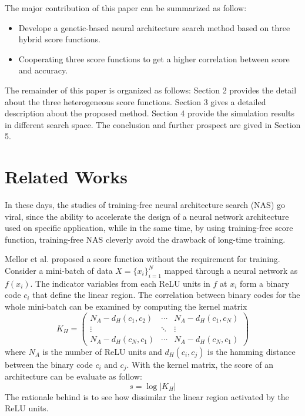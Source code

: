 \documentclass[sigconf]{acmart}
\begin{document}
    The major contribution of this paper can be summarized as follow:
    \begin{itemize}
        \item Develope a genetic-based neural architecture search method based on three hybrid score functions.
        \item Cooperating three score functions to get a higher correlation between score and accuracy.
    \end{itemize}

    The remainder of this paper is organized as follows: Section 2 provides the 
    detail about the three heterogeneous score functions. Section 3 gives a detailed 
    description about the proposed method. Section 4 provide the simulation results 
    in different search space. The conclusion and further prospect are gived in 
    Section 5.

    \section{Related Works}
    In these days, the studies of training-free neural architecture search (NAS) 
    go viral, since the ability to accelerate the design of a neural network 
    architecture used on specific application, while in the same time, by using 
    training-free score function, training-free NAS cleverly avoid the drawback 
    of long-time training. 

    Mellor et al. \cite{https://doi.org/10.48550/arxiv.2006.04647} proposed a 
    score function without the requirement for training. 
    Consider a mini-batch of data $X=\{x_i\}^N_{i=1}$ mapped through a neural 
    network as $f(x_i)$. The indicator variables from each ReLU units in $f$ 
    at $x_i$ form a binary code $c_i$ that define the linear region.
    The correlation between binary codes for the whole mini-batch can be examined 
    by computing the kernel matrix
    \begin{equation}
        K_H=\begin{pmatrix}N_A-d_H(c_1,c_2)&\cdots&N_A-d_H(c_1,c_N)\\\vdots&\ddots&\vdots\\N_A-d_H(c_N,c_1)&\cdots&N_A-d_H(c_N,c_1)\end{pmatrix}
    \end{equation}
    where $N_A$ is the number of ReLU units and $d_H(c_i,c_j)$ is the hamming 
    distance between the binary code $c_i$ and $c_j$.
    With the kernel matrix, the score of an architecture can be evaluate as 
    follow:
    \begin{equation}
        s=\log\lvert K_H\rvert
    \end{equation}
    The rationale behind is to see how dissimilar the linear region activated by 
    the ReLU units.
    
\end{document}
